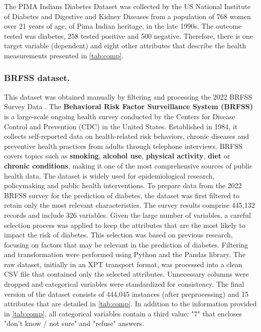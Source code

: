 \documentclass[runningheads]{llncs}
\begin{document}
The PIMA Indians Diabetes Dataset \cite{pimaDataset} was collected by the US National Institute of Diabetes and Digestive and Kidney Diseases from a population of 768 women over 21 years of age, of Pima Indian heritage, in the late 1990s. The outcome tested was diabetes, 258 tested positive and 500 negative. Therefore, there is one target variable (dependent) and eight other attributes that describe the health measurements presented in \autoref{tab:comp}. 


\subsubsection{BRFSS dataset.}

This dataset was obtained manually by filtering and processing the 2022 BRFSS Survey Data \cite{BRFSS2022}. The \textbf{Behavioral Risk Factor Surveillance System (BRFSS)} is a large-scale ongoing health survey conducted by the Centers for Disease Control and Prevention (CDC) in the United States. Established in 1984, it collects self-reported data on health-related risk behaviors, chronic diseases and preventive health practices from adults through telephone interviews. BRFSS covers topics such as \textbf{smoking}, \textbf{alcohol use}, \textbf{physical activity}, \textbf{diet} or \textbf{chronic conditions}, making it one of the most comprehensive sources of public health data. The dataset is widely used for epidemiological research, policymaking and public health interventions. 
To prepare data from the 2022 BRFSS survey for the prediction of diabetes, the dataset was first filtered to retain only the most relevant characteristics. The survey results comprise 445,132 records and include 326 variables. Given the large number of variables, a careful selection process was applied to keep the attributes that are the most likely to impact the risk of diabetes. This selection was based on previous research, focusing on factors that may be relevant in the prediction of diabetes. 
Filtering and transformation were performed using Python and the Pandas library. The raw dataset, initially in an XPT transport format, was processed into a clean CSV file that contained only the selected attributes. Unnecessary columns were dropped and categorical variables were standardized for consistency. The final version of the dataset consists of 444,045 instances (after preprocessing) and 15 attributes that are detailed in \autoref{tab:comp}. 
In addition to the information provided in \autoref{tab:comp}, all categorical variables contain a third value: "7" that encloses "don't know / not sure" and "refuse" answers. 
\end{document}
